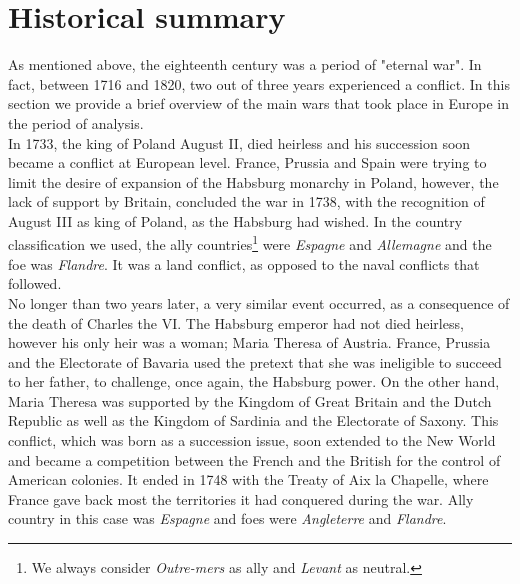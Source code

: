 \documentclass[12pt,a4paper,notitlepage,english]{article}
\begin{document}
\section{Historical summary} \label{historical_summary}
As mentioned above, the eighteenth century was a period of "eternal war". In fact, between 1716 and 1820, two out of three years experienced a conflict. In this section we provide a brief overview of the main wars that took place in Europe in the period of analysis. \\
In 1733, the king of Poland August II, died heirless and his succession soon became a conflict at European level. France, Prussia and Spain were trying to limit the desire of expansion of the Habsburg monarchy in Poland, however, the lack of support by Britain, concluded the war in 1738, with the recognition of August III as king of Poland, as the Habsburg had wished. In the country classification we used, the ally countries\footnote{We always consider \textit{Outre-mers} as ally and \textit{Levant} as neutral.} were \textit{Espagne} and \textit{Allemagne} and the foe was \textit{Flandre}. It was a land conflict, as opposed to the naval conflicts that followed. \\
No longer than two years later, a very similar event occurred, as a consequence of the death of Charles the VI. The Habsburg emperor had not died heirless, however his only heir was a woman; Maria Theresa of Austria. 
France, Prussia and the Electorate of Bavaria used the pretext that she was ineligible to succeed to her father, to challenge, once again, the Habsburg power. On the other hand, Maria Theresa was supported by the Kingdom of Great Britain and the Dutch Republic as well as the Kingdom of Sardinia and the Electorate of Saxony. This conflict, which was born as a succession issue, soon extended to the New World and became a competition between the French and the British for the control of American colonies. It ended in 1748 with the Treaty of Aix la Chapelle, where France gave back most the territories it had conquered during the war. Ally country in this case was \textit{Espagne} and foes were \textit{Angleterre} and \textit{Flandre}. \\
\end{document}
